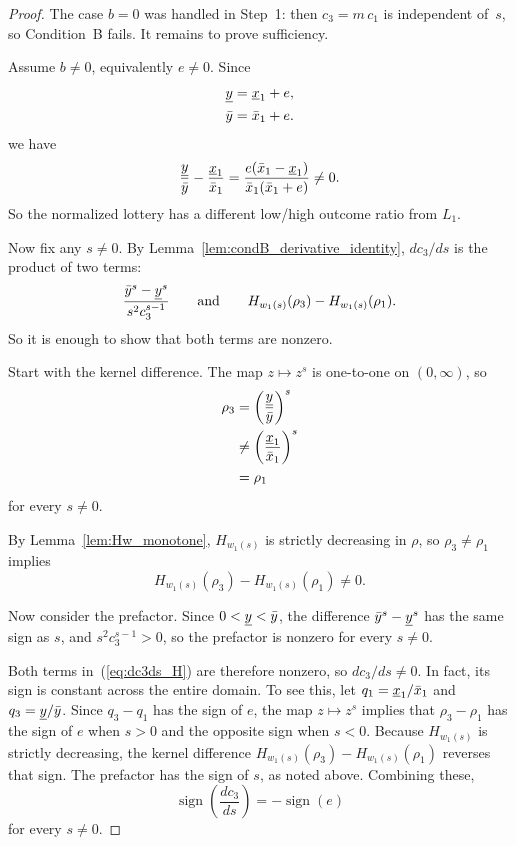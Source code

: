 \begin{proof}
The case $b = 0$ was handled in Step~1: then $c_3 = m\,c_1$ is independent
of~$s$, so Condition~B fails. It remains to prove sufficiency.

Assume $b \neq 0$, equivalently $e \neq 0$. Since
\[
  \begin{aligned}
    \underline{y} &= \underline{x}_1 + e, \\
    \bar{y} &= \bar{x}_1 + e.
  \end{aligned}
\]
we have
\[
  \frac{\underline{y}}{\bar{y}} - \frac{\underline{x}_1}{\bar{x}_1}
  = \frac{e(\bar{x}_1-\underline{x}_1)}{\bar{x}_1(\bar{x}_1+e)} \neq 0.
\]
So the normalized lottery has a different low/high outcome ratio from $L_1$.

Now fix any $s \neq 0$. By Lemma~\ref{lem:condB_derivative_identity},
$dc_3/ds$ is the
product of two terms:
\[
  \frac{\bar{y}^s - \underline{y}^s}{s^2 c_3^{s-1}}
  \qquad \text{and} \qquad
  H_{w_1(s)}(\rho_3) - H_{w_1(s)}(\rho_1).
\]
So it is enough to show that both terms are nonzero.

Start with the kernel difference. The map $z \mapsto z^s$ is one-to-one on
$(0,\infty)$, so
\[
  \begin{aligned}
    \rho_3
      &= \left(\frac{\underline{y}}{\bar{y}}\right)^s \\
      &\neq \left(\frac{\underline{x}_1}{\bar{x}_1}\right)^s \\
      &= \rho_1
  \end{aligned}
\]
for every $s \neq 0$.

By Lemma~\ref{lem:Hw_monotone}, $H_{w_1(s)}$ is strictly decreasing in $\rho$, so
$\rho_3 \neq \rho_1$ implies
\[
  H_{w_1(s)}(\rho_3) - H_{w_1(s)}(\rho_1) \neq 0.
\]

Now consider the prefactor. Since $0 < \underline{y} < \bar{y}$, the difference
$\bar{y}^s - \underline{y}^s$ has the same sign as $s$, and $s^2 c_3^{s-1} > 0$, so
the prefactor is nonzero for every $s \neq 0$.

Both terms in~(\ref{eq:dc3ds_H}) are therefore nonzero, so
$dc_3/ds \neq 0$. In fact, its sign is constant across the entire domain.
To see this, let $q_1 = \underline{x}_1/\bar{x}_1$ and $q_3 = \underline{y}/\bar{y}$.
Since $q_3 - q_1$ has the sign of $e$, the map $z \mapsto z^s$ implies that
$\rho_3 - \rho_1$ has the sign of $e$ when $s > 0$ and the opposite sign when
$s < 0$. Because $H_{w_1(s)}$ is strictly decreasing, the kernel difference
$H_{w_1(s)}(\rho_3) - H_{w_1(s)}(\rho_1)$ reverses that sign. The prefactor
has the sign of $s$, as noted above. Combining these,
\[
  \operatorname{sign}\!\left(\frac{dc_3}{ds}\right) = -\operatorname{sign}(e)
\]
for every $s \neq 0$.


\end{proof}

